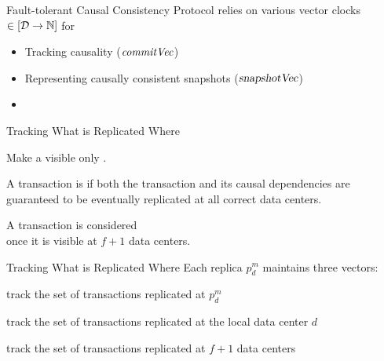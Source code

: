 
\begin{frame}{Fault-tolerant Causal Consistency Protocol}
  \unistore{} relies on various vector clocks $\in [\mathcal{D} \to \mathbb{N}]$ for \\[6pt]

  \begin{itemize}
    \setlength{\itemsep}{8pt}
    \item Tracking causality ($\mathit{commitVec}$)
    \item Representing causally consistent snapshots ($\textsl{snapshotVec}$)
    \item {}
  \end{itemize}
\end{frame}

\begin{frame}{Tracking What is Replicated Where}
  \begin{center}
    Make a   visible
    only .

    \pause
    \vspace{0.30cm}
    \begin{definition}[Uniform]
      A transaction is  if both the transaction
      and its causal dependencies are guaranteed to be eventually
      replicated at all correct data centers.
    \end{definition}

    \pause
    \vspace{0.50cm}
    A transaction is considered  \\[3pt]
    once it is visible at $f + 1$ data centers.
  \end{center}
\end{frame}

\begin{frame}{Tracking What is Replicated Where}
  Each replica $p^{m}_{d}$ maintains three vectors: \\[5pt]

  \begin{description}[<+->]
    \setlength{\itemsep}{10pt}
    \item[$\knownVC$:] track the set of transactions replicated at $p^{m}_{d}$
    \item[$\stableVC$:] track the set of transactions replicated at the local data center $d$
    \item[$\uniformVC$:] track the set of transactions replicated at $f + 1$ data centers
  \end{description}
\end{frame}

